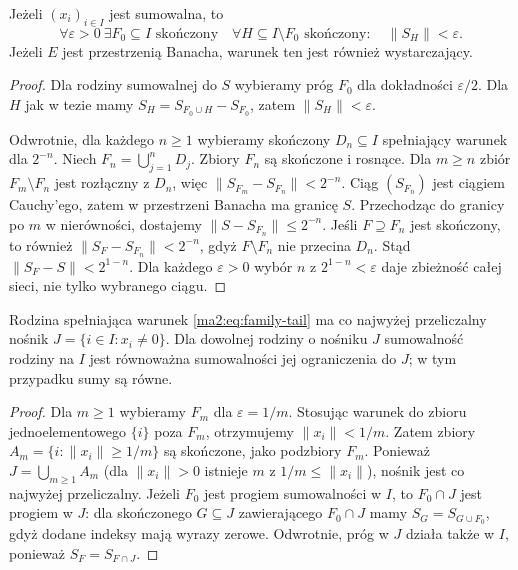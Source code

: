 \begin{twierdzenie}
\label{ma2:thm:family-cauchy}
Jeżeli $(x_i)_{i\in I}$ jest sumowalna, to
\begin{equation}
\label{ma2:eq:family-tail}
 \forall\varepsilon>0\ \exists F_0\subseteq I
 \text{ skończony}\quad
 \forall H\subseteq I\setminus F_0\text{ skończony}:
 \quad\|S_H\|<\varepsilon.
\end{equation}
Jeżeli $E$ jest przestrzenią Banacha, warunek ten
jest również wystarczający.
\end{twierdzenie}
\begin{proof}
Dla rodziny sumowalnej do $S$ wybieramy próg $F_0$
dla dokładności $\varepsilon/2$. Dla $H$ jak w tezie
mamy $S_H=S_{F_0\cup H}-S_{F_0}$, zatem
$\|S_H\|<\varepsilon$.

Odwrotnie, dla każdego $n\ge1$ wybieramy skończony
$D_n\subseteq I$ spełniający warunek dla $2^{-n}$.
Niech $F_n=\bigcup_{j=1}^nD_j$. Zbiory $F_n$ są
skończone i rosnące. Dla $m\ge n$ zbiór
$F_m\setminus F_n$ jest rozłączny z $D_n$, więc
$\|S_{F_m}-S_{F_n}\|<2^{-n}$. Ciąg $(S_{F_n})$
jest ciągiem Cauchy'ego, zatem w przestrzeni Banacha
ma granicę $S$. Przechodząc do granicy po $m$ w
nierówności, dostajemy $\|S-S_{F_n}\|\le2^{-n}$.
Jeśli $F\supseteq F_n$ jest skończony, to również
$\|S_F-S_{F_n}\|<2^{-n}$, gdyż $F\setminus F_n$
nie przecina $D_n$. Stąd $\|S_F-S\|<2^{1-n}$.
Dla każdego $\varepsilon>0$ wybór $n$ z $2^{1-n}<\varepsilon$
daje zbieżność całej sieci, nie tylko wybranego ciągu.
\end{proof}

\begin{wniosek}
\label{ma2:cor:family-support}
Rodzina spełniająca warunek \eqref{ma2:eq:family-tail}
ma co najwyżej przeliczalny nośnik
$J=\{i\in I:x_i\ne0\}$.
Dla dowolnej rodziny o nośniku $J$ sumowalność
rodziny na $I$ jest równoważna sumowalności jej
ograniczenia do $J$; w tym przypadku sumy są równe.
\end{wniosek}
\begin{proof}
Dla $m\ge1$ wybieramy $F_m$ dla $\varepsilon=1/m$.
Stosując warunek do zbioru jednoelementowego $\{i\}$
poza $F_m$, otrzymujemy $\|x_i\|<1/m$.
Zatem zbiory $A_m=\{i:\|x_i\|\ge1/m\}$ są
skończone, jako podzbiory $F_m$. Ponieważ
$J=\bigcup_{m\ge1}A_m$ (dla $\|x_i\|>0$ istnieje
$m$ z $1/m\le\|x_i\|$), nośnik jest co najwyżej
przeliczalny.
Jeżeli $F_0$ jest progiem sumowalności w $I$, to
$F_0\cap J$ jest progiem w $J$: dla skończonego
$G\subseteq J$ zawierającego $F_0\cap J$ mamy
$S_G=S_{G\cup F_0}$, gdyż dodane indeksy mają
wyrazy zerowe. Odwrotnie, próg w $J$ działa także
w $I$, ponieważ $S_F=S_{F\cap J}$.
\end{proof}

